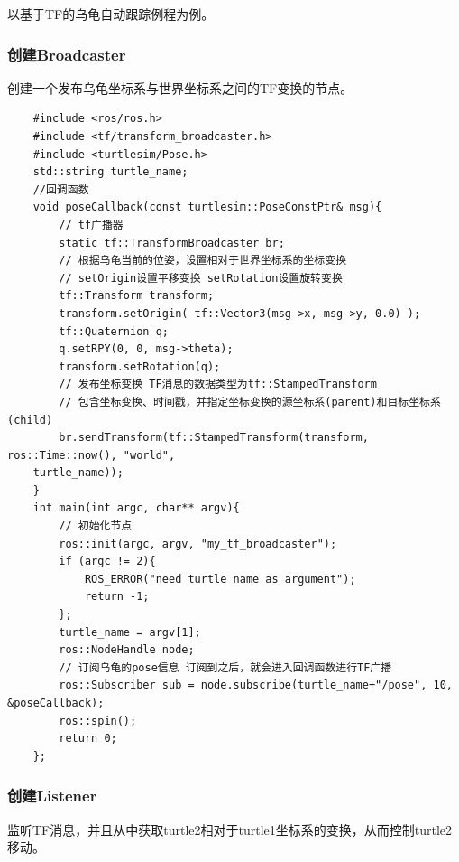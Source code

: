 \documentclass[10pt, oneside]{book}
\begin{document}
以基于TF的乌龟自动跟踪例程为例。

\subsubsection{创建Broadcaster}

创建一个发布乌龟坐标系与世界坐标系之间的TF变换的节点。

\begin{verbatim}
    #include <ros/ros.h>
    #include <tf/transform_broadcaster.h>
    #include <turtlesim/Pose.h>
    std::string turtle_name;
    //回调函数
    void poseCallback(const turtlesim::PoseConstPtr& msg){
        // tf广播器
        static tf::TransformBroadcaster br;
        // 根据乌龟当前的位姿，设置相对于世界坐标系的坐标变换
        // setOrigin设置平移变换 setRotation设置旋转变换
        tf::Transform transform;
        transform.setOrigin( tf::Vector3(msg->x, msg->y, 0.0) );
        tf::Quaternion q;
        q.setRPY(0, 0, msg->theta);
        transform.setRotation(q);
        // 发布坐标变换 TF消息的数据类型为tf::StampedTransform
        // 包含坐标变换、时间戳，并指定坐标变换的源坐标系(parent)和目标坐标系(child)
        br.sendTransform(tf::StampedTransform(transform, ros::Time::now(), "world", 
    turtle_name));
    }
    int main(int argc, char** argv){
        // 初始化节点
        ros::init(argc, argv, "my_tf_broadcaster");
        if (argc != 2){
            ROS_ERROR("need turtle name as argument"); 
            return -1;
        };
        turtle_name = argv[1];
        ros::NodeHandle node;
        // 订阅乌龟的pose信息 订阅到之后，就会进入回调函数进行TF广播
        ros::Subscriber sub = node.subscribe(turtle_name+"/pose", 10, &poseCallback);
        ros::spin();
        return 0;
    };
\end{verbatim}

\subsubsection{创建Listener}

监听TF消息，并且从中获取turtle2相对于turtle1坐标系的变换，从而控制turtle2移动。
\end{document}
